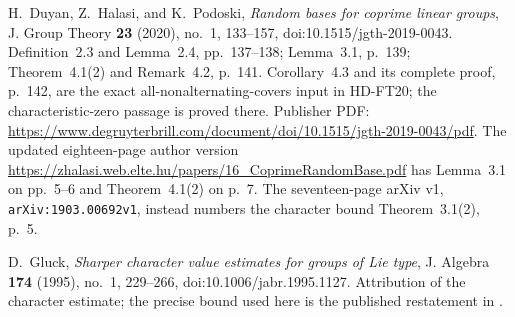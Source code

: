  H.~Duyan, Z.~Halasi, and K.~Podoski,
\emph{Random bases for coprime linear groups},
J. Group Theory \textbf{23} (2020), no.~1, 133--157,
doi:10.1515/jgth-2019-0043.
Definition~2.3 and Lemma~2.4, pp.~137--138;
Lemma~3.1, p.~139; Theorem~4.1(2) and Remark~4.2, p.~141.
Corollary~4.3 and its complete proof, p.~142, are the exact all-nonalternating-covers input in HD-FT20; the characteristic-zero passage is proved there.
Publisher PDF:
\url{https://www.degruyterbrill.com/document/doi/10.1515/jgth-2019-0043/pdf}.
The updated eighteen-page author version
\url{https://zhalasi.web.elte.hu/papers/16_CoprimeRandomBase.pdf}
has Lemma~3.1 on pp.~5--6 and Theorem~4.1(2) on p.~7.
The seventeen-page arXiv v1, \texttt{arXiv:1903.00692v1}, instead
numbers the character bound Theorem~3.1(2), p.~5.

 D.~Gluck,
\emph{Sharper character value estimates for groups of Lie type},
J. Algebra \textbf{174} (1995), no.~1, 229--266,
doi:10.1006/jabr.1995.1127.
Attribution of the character estimate; the precise bound used here
is the published restatement in \cite[Theorem~4.1(2)]{BI:DHP}.
